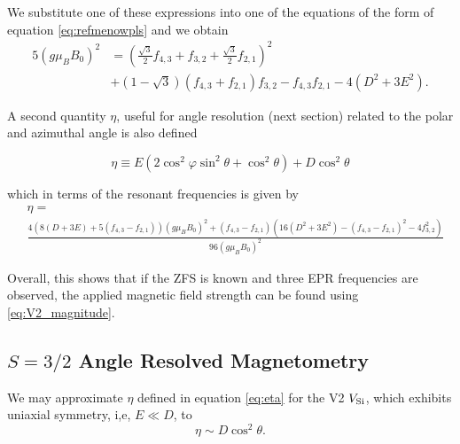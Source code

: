 We substitute one of these expressions into one of the equations of the form of equation \eqref{eq:refmenowpls} and we obtain 
\begin{equation}
    \begin{align}
        5(g\mu_B B_0)^2 &=\left(\frac{\sqrt{3}}{2}f_{4,3} + f_{3,2}  + \frac{\sqrt{3}}{2}f_{2,1}\right)^2 \\ 
        &+(1 - \sqrt{3}) (f_{4,3} + f_{2,1})f_{3,2} - f_{4,3}f_{2,1} - 4(D^2 + 3E^2).
    \end{align}
    \label{eq:V2_magnitude}
\end{equation}

A second quantity $\eta$, useful for angle resolution (next section) related to the polar and azimuthal angle is also defined

\begin{equation}
        \eta \equiv E(2\cos^2\varphi \sin^2 \theta + \cos^2\theta) + D\cos^2 \theta 
    \label{eq:eta}
\end{equation}

which in terms of the resonant frequencies is given by 
\begin{equation}
    \begin{align}
    &\eta = \\ 
    &\frac{4\left(8(D + 3E) + 5(f_{4,3}-f_{2,1})\right)(g\mu_B B_0)^2 + (f_{4,3} - f_{2,1})\left(16(D^2 + 3E^2) - (f_{4,3}-f_{2,1})^2 - 4f_{3,2}^2\right)}{96(g\mu_B B_0)^2}
\end{align}
    \label{eq:eta_resonant}

\end{equation}


Overall, this shows that if the ZFS is known and three EPR frequencies are observed, the applied magnetic field strength can be found using \eqref{eq:V2_magnitude}.




\subsection{$S=3/2$ Angle Resolved Magnetometry}
We may approximate $\eta$ defined in equation \eqref{eq:eta} for the V2 $V_{\ce{Si}}$, which exhibits uniaxial symmetry, i,e, $E\ll D$, to 
\begin{equation}
    \eta \sim D \cos^2 \theta. 
    \label{eq:}
\end{equation}

